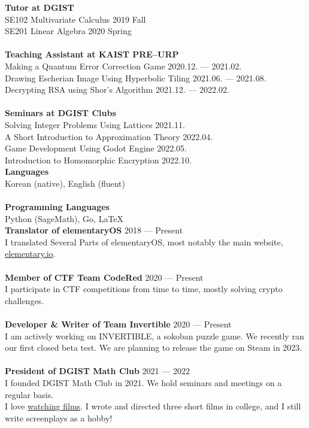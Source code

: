 \textbf{Tutor at DGIST} \\
SE102 Multivariate Calculus \hfill 2019 Fall \\
SE201 Linear Algebra \hfill 2020 Spring \\
\\
\textbf{Teaching Assistant at KAIST PRE--URP} \\
Making a Quantum Error Correction Game \hfill 2020.12. --- 2021.02. \\
Drawing Escherian Image Using Hyperbolic Tiling \hfill 2021.06. --- 2021.08. \\
Decrypting RSA using Shor's Algorithm \hfill 2021.12. --- 2022.02. \\
\\
\textbf{Seminars at DGIST Clubs} \\
Solving Integer Problems Using Lattices \hfill 2021.11. \\
A Short Introduction to Approximation Theory \hfill 2022.04. \\
Game Development Using Godot Engine \hfill 2022.05. \\
Introduction to Homomorphic Encryption \hfill 2022.10. \\

\textbf{Languages} \\
Korean (native), English (fluent) \\
\\
\textbf{Programming Languages} \\
Python (SageMath), Go, \LaTeX{}\\

\textbf{Translator of elementaryOS} \hfill 2018 --- Present \\
I translated Several Parts of elementaryOS, most notably the main website, \href{https://elementary.io/ko/}{elementary.io}. \\
\\
\textbf{Member of CTF Team CodeRed} \hfill 2020 --- Present \\
I participate in CTF competitions from time to time, mostly solving crypto challenges. \\
\\
\textbf{Developer \& Writer of Team Invertible} \hfill 2020 --- Present \\
I am actively working on INVERTIBLE, a sokoban puzzle game. We recently ran our first closed beta test. We are planning to release the game on Steam in 2023. \\
\\
\textbf{President of DGIST Math Club} \hfill 2021 --- 2022 \\
I founded DGIST Math Club in 2021. We hold seminars and meetings on a regular basis. \\

I love \href{https://letterboxd.com/sp301415/}{watching films}. I wrote and directed three short films in college, and I still write screenplays as a hobby!


